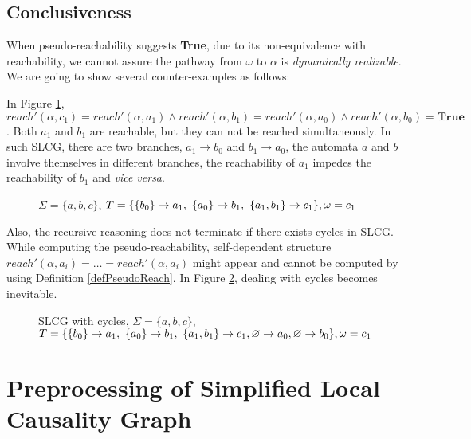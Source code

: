 \subsection{Conclusiveness}\label{sec:conclusiveness}

When pseudo-reachability suggests \textbf{True}, due to its non-equivalence with reachability, we cannot assure the pathway from $\omega$ to $\alpha$ is \textit{dynamically realizable}.
We are going to show several counter-examples as follows:

\begin{example}\label{example:unreach}
    In Figure \ref{fig:limitation}, $reach'(\alpha,c_1)=reach'(\alpha,a_1)\land reach'(\alpha,b_1)=reach'(\alpha,a_0)\land reach'(\alpha,b_0)=\textbf{True}$. Both $a_1$ and $b_1$ are reachable, but they can not be reached simultaneously.
    In such SLCG, there are two branches, $a_1\to b_0$ and $b_1\to a_0$, the automata $a$ and $b$ involve themselves in different branches, the reachability of $a_1$ impedes the reachability of $b_1$ and \textit{vice versa}.
\end{example}

\begin{figure}[ht]
    \centering
    
    \caption[Limitation of SLCG 1]{$\Sigma=\{a,b,c\}$, $T=\{\acm{b_0}{a_0}{a_1},\ \acm{a_0}{b_0}{b_1},\ \acm{a_1,b_1}{c_0}{c_1}\},\omega=c_1$}
    \label{fig:limitation}
\end{figure}

Also, the recursive reasoning does not terminate if there exists cycles in SLCG. 
While computing the pseudo-reachability, self-dependent structure  $reach'(\alpha,a_i)=\ldots=reach'(\alpha,a_i)$ might appear and cannot be computed by using Definition \ref{defPseudoReach}. 
In Figure \ref{fig:limitation2}, dealing with cycles becomes inevitable.

\begin{figure}[ht]
    \centering
    
    \caption[Limitation of SLCG 2]{SLCG with cycles, $\Sigma=\{a,b,c\}$, $T=\{\acm{b_0}{a_0}{a_1},\ \acm{a_0}{b_0}{b_1},\ \acm{a_1,b_1}{c_0}{c_1},\varnothing \to a_0, \varnothing \to b_0\},\omega=c_1$}
    \label{fig:limitation2}
\end{figure}

\section{Preprocessing of Simplified Local Causality Graph}\label{sec:chap3preprocessing}


